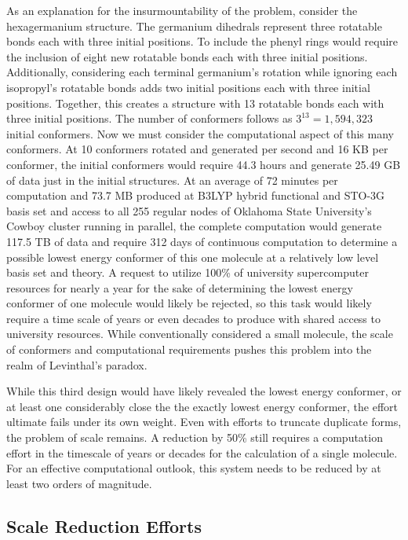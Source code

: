 As an explanation for the insurmountability of the problem, consider the hexagermanium structure. 
The germanium dihedrals represent three rotatable bonds each with three initial positions. 
To include the phenyl rings would require the inclusion of eight new rotatable bonds each with three initial positions.
Additionally, considering each terminal germanium's rotation while ignoring each isopropyl's rotatable bonds adds two initial positions each with three initial positions. 
Together, this creates a structure with 13 rotatable bonds each with three initial positions. The number of conformers follows as $3^{13} = 1,594,323$ initial conformers. 
Now we must consider the computational aspect of this many conformers.
At 10 conformers rotated and generated per second and 16 KB per conformer, the initial conformers would require 44.3 hours and generate 25.49 GB of data just in the initial structures.
At an average of 72 minutes per computation and 73.7 MB produced at B3LYP hybrid functional and STO-3G basis set and access to all 255 regular nodes of Oklahoma State University's Cowboy cluster running in parallel, the complete computation would generate 117.5 TB of data and require 312 days of continuous computation to determine a possible lowest energy conformer of this one molecule at a relatively low level basis set and theory.
A request to utilize 100\% of university supercomputer resources for nearly a year for the sake of determining the lowest energy conformer of one molecule would likely be rejected, so this task would likely require a time scale of years or even decades to produce with shared access to university resources. 
While conventionally considered a small molecule, the scale of conformers and computational requirements pushes this problem into the realm of Levinthal's paradox.

While this third design would have likely revealed the lowest energy conformer, or at least one considerably close the the exactly lowest energy conformer, the effort ultimate fails under its own weight.
Even with efforts to truncate duplicate forms, the problem of scale remains.
A reduction by 50\% still requires a computation effort in the timescale of years or decades for the calculation of a single molecule.
For an effective computational outlook, this system needs to be reduced by at least two orders of magnitude.

\subsection{Scale Reduction Efforts}

